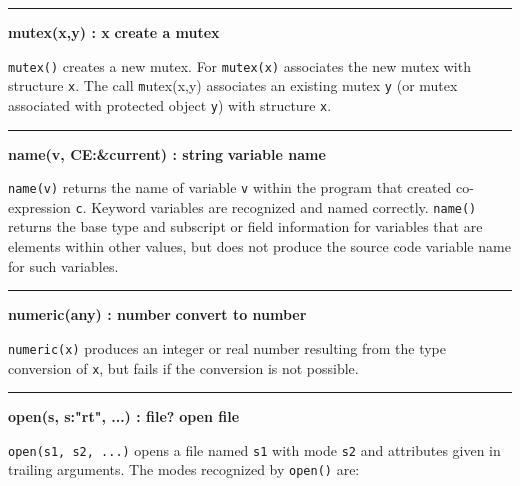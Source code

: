\bigskip\hrule\vspace{0.1cm}
\noindent
{\bf mutex(x,y) : x } \hfill {\bf create a mutex}

\noindent
{}\texttt{mutex()} creates a new mutex. For \texttt{mutex(x)}
associates the new mutex with structure \texttt{x}.
The call {\texttt mutex(x,y)} associates an existing mutex \texttt{y} (or
mutex associated with protected object \texttt{y}) with
structure \texttt{x}.

\bigskip\hrule\vspace{0.1cm}
\noindent
{\bf name(v, CE:\&current) : string } \hfill {\bf variable name}

\noindent
{}\texttt{name(v)} returns the name of variable \texttt{v}
within the program that created co-expression \texttt{c}. Keyword
variables are recognized and named correctly. \texttt{name()} returns
the base type and subscript or field information for variables that are
elements within other values, but does not produce the source code
variable name for such variables. 

\bigskip\hrule\vspace{0.1cm}
\noindent
{\bf numeric(any) : number } \hfill {\bf convert to number}

\noindent
{}\texttt{numeric(x)} produces an integer or real
number resulting from the type conversion of \texttt{x}, but fails if
the conversion is not possible.

\bigskip\hrule\vspace{0.1cm}
\noindent
{\bf open(s, s:"rt", ...) : file? } \hfill {\bf open file}

\noindent
{}\texttt{open(s1, s2, ...)} opens a file named
\texttt{s1} with mode \texttt{s2} and attributes given in trailing
arguments. The modes recognized by \texttt{open()} are: 

